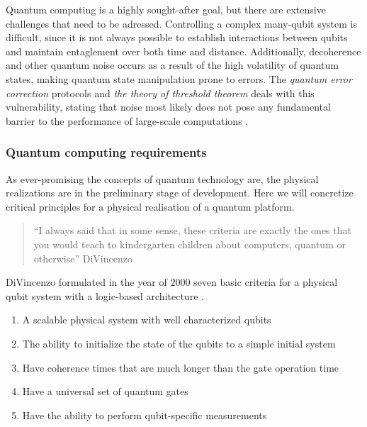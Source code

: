 
Quantum computing is a highly sought-after goal, but there are extensive challenges that need to be adressed. Controlling a complex many-qubit system is difficult, since it is not always possible to establish interactions between qubits \cite{DiVincenzo2000} and maintain entaglement over both time and distance. Additionally, decoherence and other quantum noise occurs as a result of the high volatility of quantum states, making quantum state manipulation prone to errors. The \textit{quantum error correction} protocols and \textit{the theory of threshold theorem} \cite{Pavicic2006, Gottesman2009} deals with this vulnerability, stating that noise most likely does not pose any fundamental barrier to the performance of large-scale computations \cite{Pavicic2006}.


\subsubsection{Quantum computing requirements}
As ever-promising the concepts of quantum technology are, the physical realizations are in the preliminary stage of development. Here we will concretize critical principles for a physical realisation of a quantum platform.

\begin{quote}
   ``I always said that in some sense, these criteria are exactly the ones that you would teach to kindergarten children about computers, quantum or otherwise'' DiVincenzo \cite{Georgescu2020}
\end{quote}

\noindent DiVincenzo formulated in the year of $2000$ seven basic criteria for a physical qubit system with a logic-based architecture \cite{DiVincenzo2000}.

\begin{enumerate}
  \item A scalable physical system with well characterized qubits
  \item The ability to initialize the state of the qubits to a simple initial system
  \item Have coherence times that are much longer than the gate operation time
  \item Have a universal set of quantum gates
  \item Have the ability to perform qubit-specific measurements
\end{enumerate}

